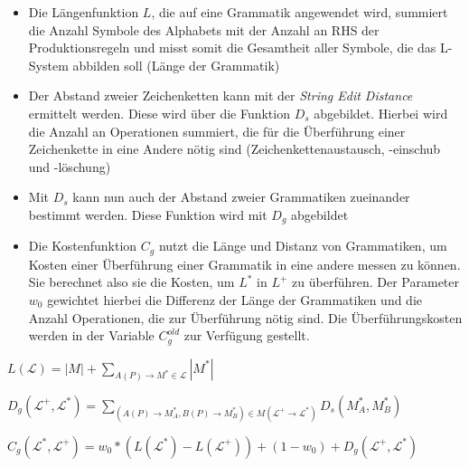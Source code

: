 \begin{itemize}
    \item Die Längenfunktion $L$, die auf eine Grammatik angewendet wird, summiert die Anzahl Symbole des Alphabets mit
    der Anzahl an RHS der Produktionsregeln und misst somit die Gesamtheit aller Symbole, die das L-System abbilden soll
    (Länge der Grammatik)
    \item Der Abstand zweier Zeichenketten kann mit der \textit{String Edit Distance} ermittelt werden. Diese wird über
    die Funktion $D_s$ abgebildet. Hierbei wird die Anzahl an Operationen summiert, die für die Überführung einer Zeichenkette
    in eine Andere nötig sind (Zeichenkettenaustausch, -einschub und -löschung)
    \item Mit $D_s$ kann nun auch der Abstand zweier Grammatiken zueinander bestimmt werden. Diese Funktion wird mit
    $D_g$ abgebildet
    \item Die Kostenfunktion $C_g$ nutzt die Länge und Distanz von Grammatiken, um Kosten einer Überführung einer Grammatik
    in eine andere messen zu können. Sie berechnet also sie die Kosten, um $L^*$ in $L^+$ zu überführen.
    Der Parameter $w_0$ gewichtet hierbei die Differenz der Länge der Grammatiken und die Anzahl Operationen, die zur
    Überführung nötig sind. Die Überführungskosten werden in der Variable $C^{old}_g$ zur Verfügung gestellt.
\end{itemize}

\begin{algorithm}[caption={Längenfunktion $L$ für Grammatiken}]
$L(\mathcal{L}) = |M| + \sum\limits_{A(P) \rightarrow M^* \in \mathcal{L}} |M^*|$
\end{algorithm}

\begin{algorithm}[caption={Grammar Edit Distance}]
    $D_g(\mathcal{L}^+, \mathcal{L}^*)= \sum\limits_{(A(P) \rightarrow M^*_A , B(P) \rightarrow M^*_B) \in M(\mathcal{L^+} \rightarrow \mathcal{L^*})} D_s(M^*_A, M^*_B)$
\end{algorithm}

\begin{algorithm}[caption={Kostenfunktion $C_g$ mit Gewichtung $w_0$}]
$C_g(\mathcal{L}^*, \mathcal{L}^+) = w_0 * (L(\mathcal{L}^*) - L(\mathcal{L}^+)) + (1 - w_0) + D_g(\mathcal{L}^+, \mathcal{L}^*)$
\end{algorithm}

\newpage

